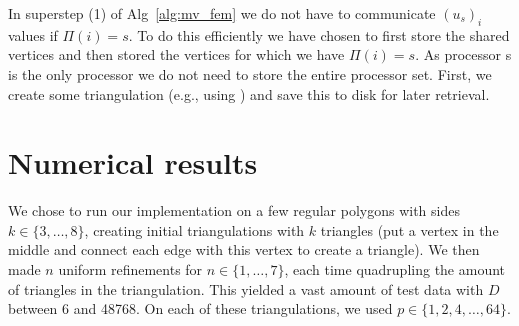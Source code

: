 \documentclass[11pt]{amsart}
\theoremstyle{definition}
\begin{document}
In superstep (1) of Alg~\ref{alg:mv_fem} we do not have to communicate $(u_s)_i$ values if $\Pi(i) = s$. To do this efficiently we have chosen to first store the shared vertices and then stored the vertices for which we have $\Pi(i)=s$. As processor s is the only processor we do not need to store the entire processor set.
First, we create some triangulation (e.g., using \cite{TODOJAN}) and save this to disk for later retrieval. 
\section{Numerical results}
We chose to run our implementation on a few regular polygons with sides $k \in \{3, \ldots, 8\}$, creating initial triangulations with $k$ triangles (put a vertex in the middle and connect each edge with this vertex to create a triangle). We then made $n$ uniform refinements for $n \in \{1, \ldots, 7\}$, each time quadrupling the amount of triangles in the triangulation. This yielded a vast amount of test data with $D$ between 6 and 48768. On each of these triangulations, we used $p \in \{1, 2, 4, \ldots, 64\}$.
\end{document}

